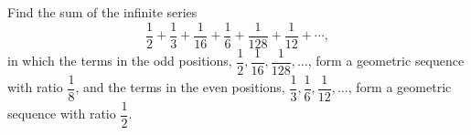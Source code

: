 Find the sum of the infinite series
\[\dfrac12+\dfrac13+\dfrac{1}{16}+\dfrac16+\dfrac{1}{128}+\dfrac{1}{12}+\cdots,\]
in which the terms in the odd positions, $\dfrac12,\dfrac{1}{16},\dfrac{1}{128},\dots$, form a geometric sequence with ratio $\dfrac18$, and the terms in the even positions, $\dfrac13,\dfrac16,\dfrac{1}{12},\dots$, form a geometric sequence with ratio $\dfrac12$.
